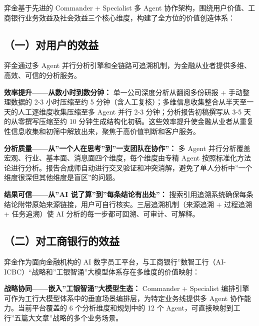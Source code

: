 \documentclass[
]{ctexart}
\begin{document}
弈金基于先进的 Commander + Specialist 多 Agent
协作架构，围绕用户价值、工商银行业务效益及社会效益三个核心维度，构建了全方位的价值创造体系：

\subsection{（一）对用户的效益}\label{ux4e00ux5bf9ux7528ux6237ux7684ux6548ux76ca}

弈金通过多 Agent
并行分析引擎和全链路可追溯机制，为金融从业者提供多维、高效、可信的分析服务。

\textbf{效率提升------从数小时到数分钟：} 单一公司深度分析从翻阅多份研报
+ 手动整理数据的 2-3 小时压缩至约 5
分钟（含人工复核）；多维信息收集整合从半天至一天的人工逐维度收集压缩至多
Agent 并行 2-3 分钟；分析报告初稿撰写从 3-5 天的从零撰写压缩至约 10
分钟生成结构化初稿。这些效率提升使金融从业者从重复性信息收集和初筛中解放出来，聚焦于高价值判断和客户服务。

\textbf{分析质量------从''一个人在思考''到''一支团队在协作''：} 多 Agent
并行分析覆盖宏观、行业、基本面、消息面四个维度，每个维度由专精 Agent
按照标准化方法论进行分析。报告合成师自动进行交叉验证和冲突消解，避免了单人分析中''一个维度很深但其他维度是盲区''的问题。

\textbf{结果可信------从''AI 说了算''到''每条结论有出处''：}
搜索引用追溯系统确保每条结论附带原始来源链接，用户可自行核实。三层追溯机制（来源追溯
+ 过程追溯 + 任务追溯）使 AI 分析的每一步都可回溯、可审计、可解释。

\subsection{（二）对工商银行的效益}\label{ux4e8cux5bf9ux5de5ux5546ux94f6ux884cux7684ux6548ux76ca}

弈金作为面向金融机构的 AI
数字员工平台，与工商银行''数智工行（AI-ICBC）``战略和''工银智涌''大模型体系存在多维度的价值映射：

\textbf{战略协同------嵌入''工银智涌''大模型生态：} Commander +
Specialist
编排引擎可作为工行大模型体系中的垂直场景编排层，为特定业务线提供多 Agent
协作能力。当前平台覆盖的 6 个分析维度和规划中的 12 个
Agent，可直接映射到工行''五篇大文章''战略的多个业务场景。
\end{document}
